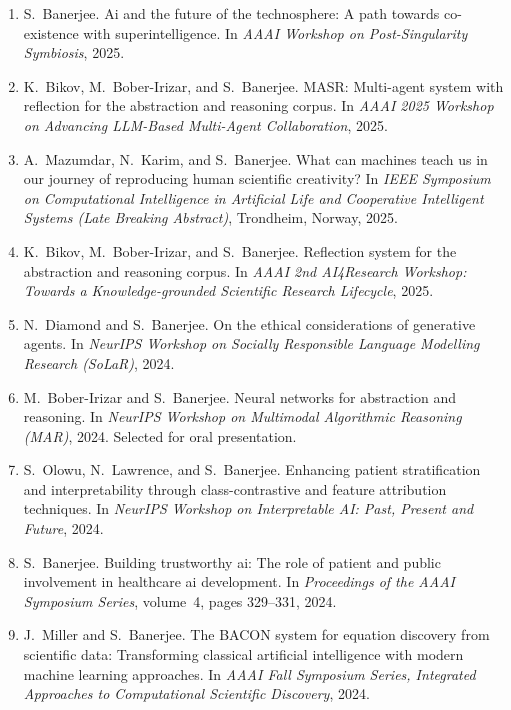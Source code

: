 \documentclass[11pt,a4paper]{article}
\begin{document}
\begin{enumerate}
  \item S.~Banerjee. Ai and the future of the technosphere: A path towards co-existence with superintelligence. In {\em AAAI Workshop on Post-Singularity Symbiosis}, 2025.
  \item K.~Bikov, M.~Bober-Irizar, and S.~Banerjee. {MASR}: Multi-agent system with reflection for the abstraction and reasoning corpus. In {\em AAAI 2025 Workshop on Advancing LLM-Based Multi-Agent Collaboration}, 2025.
  \item A.~Mazumdar, N.~Karim, and S.~Banerjee. What can machines teach us in our journey of reproducing human scientific creativity? In {\em IEEE Symposium on Computational Intelligence in Artificial Life and Cooperative Intelligent Systems (Late Breaking Abstract)}, Trondheim, Norway, 2025.
  \item K.~Bikov, M.~Bober-Irizar, and S.~Banerjee. Reflection system for the abstraction and reasoning corpus. In {\em AAAI 2nd AI4Research Workshop: Towards a Knowledge-grounded Scientific Research Lifecycle}, 2025.
  \item N.~Diamond and S.~Banerjee. On the ethical considerations of generative agents. In {\em NeurIPS Workshop on Socially Responsible Language Modelling Research (SoLaR)}, 2024.
  \item M.~Bober-Irizar and S.~Banerjee. Neural networks for abstraction and reasoning. In {\em NeurIPS Workshop on Multimodal Algorithmic Reasoning (MAR)}, 2024. Selected for oral presentation.
  \item S.~Olowu, N.~Lawrence, and S.~Banerjee. Enhancing patient stratification and interpretability through class-contrastive and feature attribution techniques. In {\em NeurIPS Workshop on Interpretable AI: Past, Present and Future}, 2024.
  \item S.~Banerjee. Building trustworthy ai: The role of patient and public involvement in healthcare ai development. In {\em Proceedings of the AAAI Symposium Series}, volume~4, pages 329--331, 2024.
  \item J.~Miller and S.~Banerjee. The {BACON} system for equation discovery from scientific data: Transforming classical artificial intelligence with modern machine learning approaches. In {\em AAAI Fall Symposium Series, Integrated Approaches to Computational Scientific Discovery}, 2024.
\end{enumerate}
\end{document}
